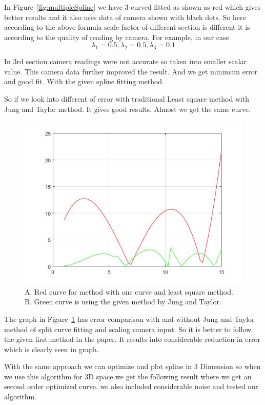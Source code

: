 In Figure~\ref{fig:multipleSpline} we have 3 curved fitted as shown as red which gives better results and it also uses data of camera shown with black dots. So here according to the above formula scale factor of different section is different it is according to the quality of reading by camera.
For example, in our case 
\begin{equation}
\lambda_1=0.5 ,\lambda_2=0.5 ,\lambda_3=0.1
\end{equation}

In 3rd section camera readings were not accurate so taken into smaller scalar value. This camera data further improved the result. And we get minimum error and good fit. With the given spline fitting method.

So if we look into different of error with traditional Least square method with Jung and Taylor method. It gives good results. Almost we get the same curve.

\begin{figure}[!htb]
\includegraphics[width=\textwidth]{./figures/ErrorC.jpg}
\caption{A. Red curve for method with one curve and least square method. 
B. Green curve is using the given method by Jung and Taylor.}
\label{fig:errorc1}
\end{figure}

The graph in Figure~\ref{fig:errorc1} has error comparison with and without Jung and Taylor method of split curve fitting and scaling camera input.
So it is better to follow the given first method in the paper. It results into considerable reduction in error which is clearly seen in graph.

With the same approach we can optimize and plot spline in 3 Dimension so when we use this algorithm for 3D space we get the following result where we get an second order optimized curve. we also included considerable noise and tested our algorithm.
  
